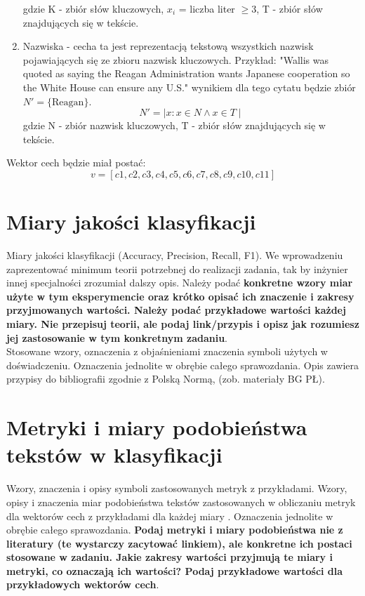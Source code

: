 \documentclass{article}
\begin{document}
\begin{enumerate}
       gdzie K - zbiór słów kluczowych, \( x_i \) = liczba liter \( \geq 3 \), T - zbiór słów znajdujących się w tekście.
    \item Nazwiska - cecha ta jest reprezentacją tekstową wszystkich nazwisk pojawiających się ze zbioru nazwisk kluczowych. Przykład: "Wallis was quoted as saying the Reagan Administration wants Japanese cooperation so the White House can ensure any U.S." wynikiem dla tego cytatu będzie zbiór \( N' = \{ \text{Reagan} \} \).
    \begin{equation}
            N' =  \mid x : x \in N \land x \in T \mid
        \end{equation}
        gdzie N - zbiór nazwisk kluczowych, T - zbiór słów znajdujących się w tekście.
\end{enumerate}

Wektor cech będzie miał postać: 
        \begin{equation}
          v = [c1, c2, c3, c4, c5, c6, c7, c8, c9, c10, c11]
        \end{equation}

\section{Miary jakości klasyfikacji} 
Miary jakości klasyfikacji (Accuracy, Precision,
Recall, F1). We wprowadzeniu zaprezentować minimum teorii potrzebnej do realizacji
zadania, tak by inżynier innej specjalności zrozumiał dalszy opis. Należy podać {\bf konkretne wzory miar użyte w tym eksperymencie oraz krótko
opisać ich znaczenie i zakresy przyjmowanych wartości. Należy podać przykładowe
wartości każdej miary. Nie przepisuj
teorii, ale podaj link/przypis i opisz jak rozumiesz jej zastosowanie w tym konkretnym
zadaniu}. \\
\indent Stosowane wzory, oznaczenia z objaśnieniami znaczenia symboli użytych w
doświadczeniu. Oznaczenia jednolite w obrębie całego sprawozdania.  Opis zawiera przypisy do bibliografii zgodnie z
Polską Normą, (zob. materiały BG PŁ).\\


\section{Metryki i miary podobieństwa tekstów w klasyfikacji}
Wzory, znaczenia i opisy symboli zastosowanych metryk z
przykładami. Wzory, opisy i znaczenia miar
podobieństwa tekstów zastosowanych w obliczaniu metryk dla wektorów cech z
przykładami dla każdej miary \cite{niewiadomski08}.  Oznaczenia jednolite w obrębie całego sprawozdania.  {\bf Podaj metryki i miary
podobieństwa nie z literatury (te wystarczy zacytować linkiem), ale konkretne ich
postaci stosowane w zadaniu. Jakie zakresy wartości przyjmują te miary i
metryki, co oznaczają ich wartości? Podaj przykładowe wartości dla przykładowych wektorów cech}. \\ 
\end{document}
